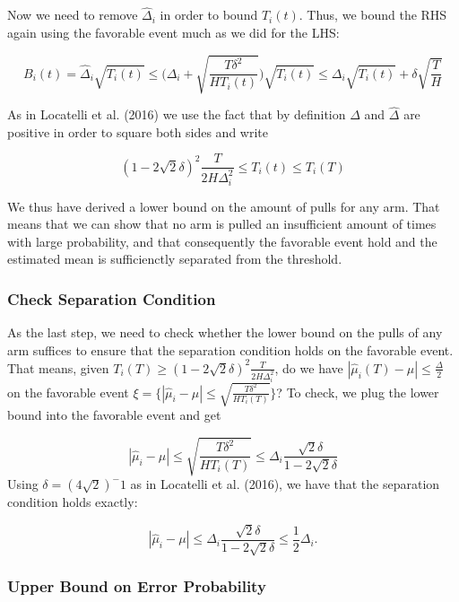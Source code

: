\documentclass[11pt,]{article}
\begin{document}
Now we need to remove \(\hat{\Delta}_i\) in order to bound \(T_i(t)\).
Thus, we bound the RHS again using the favorable event much as we did
for the LHS:

\[
B_i(t) = \hat{\Delta}_i \sqrt{T_i(t)} \leq \Big(\Delta_i + \sqrt{\frac{T\delta^2}{HT_i(t)}}\Big) \sqrt{T_i(t)} \leq \Delta_i \sqrt{T_i(t)} + \delta \sqrt{\frac{T}{H}}
\]

As in Locatelli et al. (2016) we use the fact that by definition
\(\Delta\) and \(\hat{\Delta}\) are positive in order to square both
sides and write

\[
(1 - 2\sqrt{2}\delta)^2 \frac{T}{2H\Delta^2_i} \leq T_i(t) \leq T_i(T)
\]

We thus have derived a lower bound on the amount of pulls for any arm.
That means that we can show that no arm is pulled an insufficient amount
of times with large probability, and that consequently the favorable
event hold and the estimated mean is sufficienctly separated from the
threshold.

\subsubsection{\texorpdfstring{Check Separation Condition
\label{sec:CheckSeparationCondition}}{Check Separation Condition }}\label{check-separation-condition}

As the last step, we need to check whether the lower bound on the pulls
of any arm suffices to ensure that the separation condition holds on the
favorable event. That means, given
\(T_i(T) \geq (1-2\sqrt{2}\delta)^2 \frac{T}{2H\Delta_i^2}\), do we have
\(|\hat{\mu}_i(T) - \mu | \leq \frac{\Delta}{2}\) on the favorable event
\(\xi = \Big\{|\hat{\mu}_i - \mu | \leq \sqrt{\frac{T\delta^2}{H T_i(T)}}\Big\}\)?
To check, we plug the lower bound into the favorable event and get

\[
|\hat{\mu}_i - \mu | \leq \sqrt{\frac{T\delta^2}{H T_i(T)}} \leq \Delta_i \frac{\sqrt{2}\delta}{1-2\sqrt{2}\delta}
\] Using \(\delta = (4\sqrt{2})^-1\) as in Locatelli et al. (2016), we
have that the separation condition holds exactly:

\[
|\hat{\mu}_i - \mu | \leq \Delta_i \frac{\sqrt{2}\delta}{1-2\sqrt{2}\delta} \leq \frac{1}{2}\Delta_i.
\]

\subsubsection{Upper Bound on Error
Probability}\label{upper-bound-on-error-probability}
\end{document}
